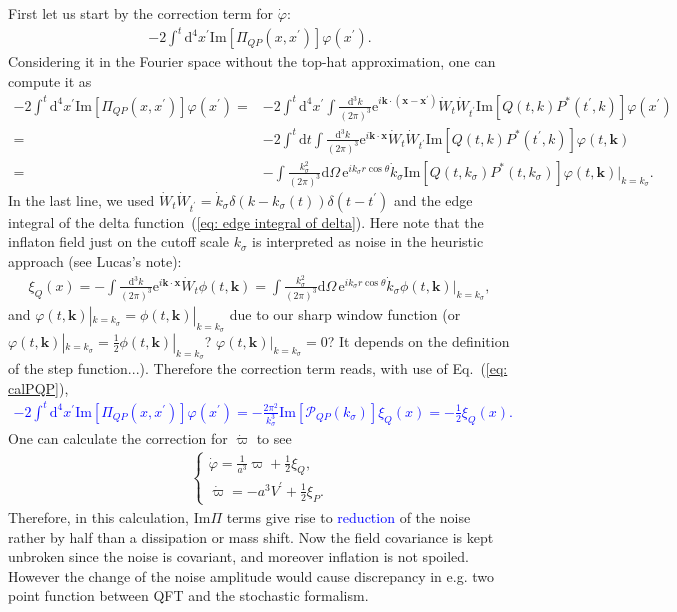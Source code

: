 \documentclass[aps, prd
, preprint
, nofootinbib 
]{revtex4-1}
\newcommand{\dd}{\mathrm{d}}
\newcommand{\ee}{\mathrm{e}}
\newcommand{\calP}{\mathcal{P}}
\renewcommand{\Im}{\mathrm{Im}}
\newcommand{\dk}{\frac{\dd^3k}{(2\pi)^3}}
\newcommand{\dps}{\displaystyle}
\newcommand{\bae}[1]{\begin{align} #1 \end{align}}
\newcommand{\bce}[1]{\begin{cases} #1 \end{cases}}
\newcommand{\Blue}[1]{\textcolor{blue}{\sffamily #1}}
\begin{document}
First let us start by the correction term for $\dot{\varphi}$:
\bae{
	-2\int^t\dd^4x^\prime\Im[\Pi_{QP}(x,x^\prime)]\varphi(x^\prime).
}
Considering it in the Fourier space without the top-hat approximation, one can compute it as
\bae{
	-2\int^t\dd^4x^\prime\Im[\Pi_{QP}(x,x^\prime)]\varphi(x^\prime)=&-2\int^t\dd^4x^\prime\int\dk
	\ee^{i\mathbf{k}\cdot{(\mathbf{x}-\mathbf{x}^\prime)}}\dot{W}_t\dot{W}_{t^\prime}\Im[Q(t,k)P^*(t^\prime,k)]\varphi(x^\prime) \nonumber \\
	=&-2\int^t\dd t\int\dk\ee^{i\mathbf{k}\cdot\mathbf{x}}\dot{W}_t\dot{W}_{t^\prime}\Im[Q(t,k)P^*(t^\prime,k)]\varphi(t,\mathbf{k}) \nonumber \\
	=&-\int\frac{k_\sigma^2}{(2\pi)^3}\dd\Omega\,\ee^{ik_\sigma r\cos\theta}\dot{k}_\sigma\Im[Q(t,k_\sigma)P^*(t,k_\sigma)]
	\varphi(t,\mathbf{k})|_{k=k_\sigma}.
}
In the last line, we used $\dot{W}_t\dot{W}_{t^\prime}=\dot{k}_\sigma\delta(k-k_\sigma(t))\delta(t-t^\prime)$ and 
the edge integral of the delta function~(\ref{eq: edge integral of delta}).
Here note that the inflaton field just on the cutoff scale $k_\sigma$ is interpreted as noise in the heuristic approach (see Lucas's note):
\bae{
	\xi_Q(x)=-\int\dk\ee^{i\mathbf{k}\cdot\mathbf{x}}\dot{W}_t\phi(t,\mathbf{k})=\int\frac{k_\sigma^2}{(2\pi)^3}\dd\Omega\,\ee^{ik_\sigma r\cos\theta}
	\dot{k}_\sigma\phi(t,\mathbf{k})|_{k=k_\sigma},
}
and $\varphi(t,\mathbf{k})|_{k=k_\sigma}=\phi(t,\mathbf{k})|_{k=k_\sigma}$ due to our sharp window function
(or $\varphi(t,\mathbf{k})|_{k=k_\sigma}=\frac{1}{2}\phi(t,\mathbf{k})|_{k=k_\sigma}$? $\varphi(t,\mathbf{k})|_{k=k_\sigma}=0$?
It depends on the definition of the step function...).
Therefore the correction term reads, with use of Eq.~(\ref{eq: calPQP}),
\Blue{
\bae{
	-2\int^t\dd^4x^\prime\Im[\Pi_{QP}(x,x^\prime)]\varphi(x^\prime)=-\frac{2\pi^2}{k_\sigma^3}\Im[\calP_{QP}(k_\sigma)]\xi_Q(x)=-\frac{1}{2}\xi_Q(x).
}}
One can calculate the correction for $\dot{\varpi}$ to see
\bae{
	\bce{
		\dps
		\dot{\varphi}=\frac{1}{a^3}\varpi+\frac{1}{2}\xi_Q, \\[10pt]
		\dps
		\dot{\varpi}=-a^3V^\prime+\frac{1}{2}\xi_P.
	}
}
Therefore, in this calculation, $\Im\Pi$ terms give rise to \Blue{reduction} of the noise rather by half than a dissipation or mass shift.
Now the field covariance is kept unbroken since the noise is covariant, and moreover inflation is not spoiled.
However the change of the noise amplitude would cause discrepancy in e.g. two point function between QFT and the stochastic formalism.
\end{document}
